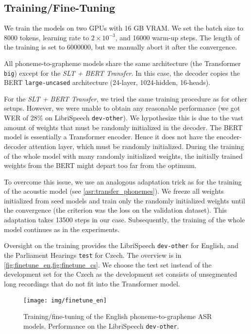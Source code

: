 \subsection{Training/Fine-Tuning}
We train the models on two GPUs with 16 GB VRAM. We set the batch size to 8000 tokens, learning rate to $2 \times 10^{-3}$, and 16000 warm-up steps. The length of the training is set to 6000000, but we manually abort it after the convergence.

All phoneme-to-grapheme models share the same architecture (the Transformer \texttt{big}) except for the \emph{SLT + BERT Transfer}. In this case, the decoder copies the BERT \texttt{large-uncased} architecture (24-layer, 1024-hidden, 16-heads). 

For the \emph{SLT + BERT Transfer}, we tried the same training procedure as for other setups. However, we were unable to obtain any reasonable performance (we got WER of 28\% on LibriSpeech \texttt{dev-other}). We hypothesize this is due to the vast amount of weights that must be randomly initialized in the decoder. The BERT model is essentially a Transformer encoder. Hence it does not have the encoder-decoder attention layer, which must be randomly initialized. During the training of the whole model with many randomly initialized weights, the initially trained weights from the BERT might depart too far from the optimum.

To overcome this issue, we use an analogous adaptation trick as for the training of the acoustic model (see \cref{asr:transfer_phonemes}). We freeze all weights initialized from seed models and train only the randomly initialized weights until the convergence (the criterion was the loss on the validation dataset). This adaptation takes 13500 steps in our case. Subsequently, the training of the whole model continues as in the experiments.

Oversight on the training provides the LibriSpeech \texttt{dev-other} for English, and the Parliament Hearings \texttt{test} for Czech. The overview is in \cref{fig:finetune_en,fig:finetune_cs}. We choose the test set instead of the development set for the Czech as the development set consists of unsegmented long recordings that do not fit into the Transformer model.

\begin{figure}[h]
	\texttt{[image: img/finetune\_en]}
	\caption[English enhanced ASR fine-tuning]{Training/fine-tuning of the English phoneme-to-grapheme ASR models. Performance on the LibriSpeech \texttt{dev-other}.}
	\label{fig:finetune_en}
\end{figure}

